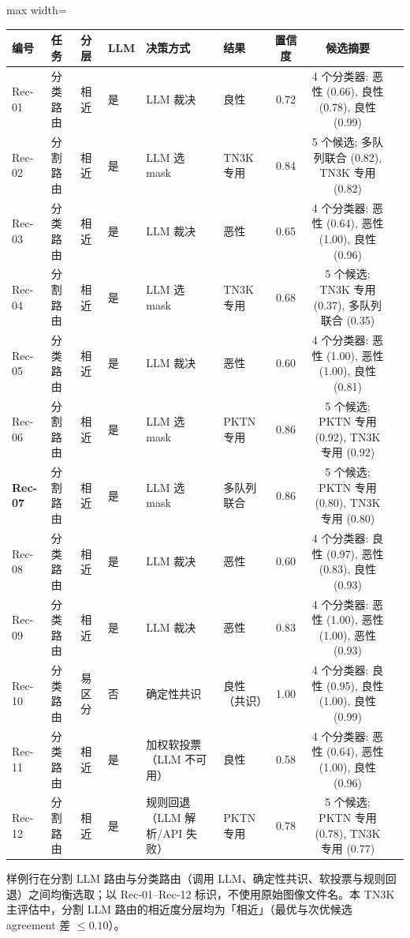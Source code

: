 \begin{responseinlinetable}
\label{tab_A1_audit_exemplars}
\begin{adjustbox}{max width=\textwidth}
\footnotesize
\begin{tabular}{llllllccp{}}
\toprule
\textbf{编号} & \textbf{任务} & \textbf{分层} & \textbf{LLM} & \textbf{决策方式} & \textbf{结果} & \textbf{置信度} & \textbf{候选摘要} \\
\midrule
Rec-01 & 分类路由 & 相近 & 是 & LLM 裁决 & 良性 & 0.72 & 4 个分类器: 恶性 (0.66), 良性 (0.78), 良性 (0.99) \\
Rec-02 & 分割路由 & 相近 & 是 & LLM 选 mask & TN3K 专用 & 0.84 & 5 个候选; 多队列联合 (0.82), TN3K 专用 (0.82) \\
Rec-03 & 分类路由 & 相近 & 是 & LLM 裁决 & 恶性 & 0.65 & 4 个分类器: 恶性 (0.64), 恶性 (1.00), 良性 (0.96) \\
Rec-04 & 分割路由 & 相近 & 是 & LLM 选 mask & TN3K 专用 & 0.68 & 5 个候选; TN3K 专用 (0.37), 多队列联合 (0.35) \\
Rec-05 & 分类路由 & 相近 & 是 & LLM 裁决 & 恶性 & 0.60 & 4 个分类器: 恶性 (1.00), 恶性 (1.00), 良性 (0.81) \\
Rec-06 & 分割路由 & 相近 & 是 & LLM 选 mask & PKTN 专用 & 0.86 & 5 个候选; PKTN 专用 (0.92), TN3K 专用 (0.92) \\
\textbf{Rec-07} & 分割路由 & 相近 & 是 & LLM 选 mask & 多队列联合 & 0.86 & 5 个候选; PKTN 专用 (0.80), TN3K 专用 (0.80) \\
Rec-08 & 分类路由 & 相近 & 是 & LLM 裁决 & 恶性 & 0.60 & 4 个分类器: 良性 (0.97), 恶性 (0.83), 良性 (0.93) \\
Rec-09 & 分类路由 & 相近 & 是 & LLM 裁决 & 恶性 & 0.83 & 4 个分类器: 恶性 (1.00), 恶性 (1.00), 恶性 (0.93) \\
Rec-10 & 分类路由 & 易区分 & 否 & 确定性共识 & 良性（共识） & 1.00 & 4 个分类器: 良性 (0.95), 良性 (1.00), 良性 (0.99) \\
Rec-11 & 分类路由 & 相近 & 是 & 加权软投票（LLM 不可用） & 良性 & 0.58 & 4 个分类器: 恶性 (0.64), 恶性 (1.00), 良性 (0.96) \\
Rec-12 & 分割路由 & 相近 & 是 & 规则回退（LLM 解析/API 失败） & PKTN 专用 & 0.78 & 5 个候选; PKTN 专用 (0.78), TN3K 专用 (0.77) \\
\bottomrule
\end{tabular}
\end{adjustbox}
\end{responseinlinetable}
\par\smallskip\noindent\footnotesize 样例行在分割 LLM 路由与分类路由（调用 LLM、确定性共识、软投票与规则回退）之间均衡选取；以 Rec-01--Rec-12 标识，不使用原始图像文件名。本 TN3K 主评估中，分割 LLM 路由的相近度分层均为「相近」（最优与次优候选 agreement 差 $\leq 0.10$）。
